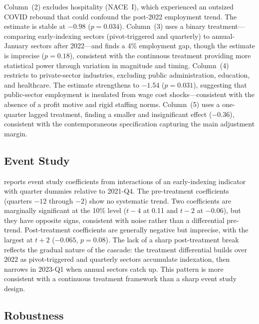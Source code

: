 \documentclass[12pt]{article}
\begin{document}
Column~(2) excludes hospitality (NACE~I), which experienced an outsized COVID rebound that could confound the post-2022 employment trend. The estimate is stable at $-0.98$ ($p = 0.034$). Column~(3) uses a binary treatment---comparing early-indexing sectors (pivot-triggered and quarterly) to annual-January sectors after 2022---and finds a 4\% employment gap, though the estimate is imprecise ($p = 0.18$), consistent with the continuous treatment providing more statistical power through variation in magnitude and timing. Column~(4) restricts to private-sector industries, excluding public administration, education, and healthcare. The estimate strengthens to $-1.54$ ($p = 0.031$), suggesting that public-sector employment is insulated from wage cost shocks---consistent with the absence of a profit motive and rigid staffing norms. Column~(5) uses a one-quarter lagged treatment, finding a smaller and insignificant effect ($-0.36$), consistent with the contemporaneous specification capturing the main adjustment margin.



\subsection{Event Study}

 reports event study coefficients from interactions of an early-indexing indicator with quarter dummies relative to 2021-Q4. The pre-treatment coefficients (quarters $-12$ through $-2$) show no systematic trend. Two coefficients are marginally significant at the 10\% level ($t-4$ at 0.11 and $t-2$ at $-0.06$), but they have opposite signs, consistent with noise rather than a differential pre-trend. Post-treatment coefficients are generally negative but imprecise, with the largest at $t+2$ ($-0.065$, $p = 0.08$). The lack of a sharp post-treatment break reflects the gradual nature of the cascade: the treatment differential builds over 2022 as pivot-triggered and quarterly sectors accumulate indexation, then narrows in 2023-Q1 when annual sectors catch up. This pattern is more consistent with a continuous treatment framework than a sharp event study design.



\subsection{Robustness}
\end{document}
